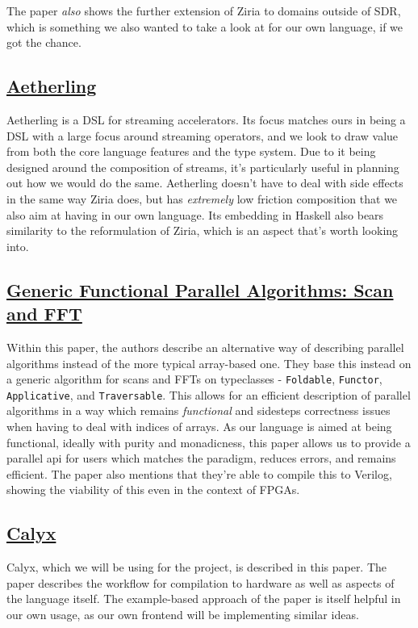 \documentclass{article}
\begin{document}
The paper \textit{also} shows the further extension of Ziria to domains outside of SDR,
which is something we also wanted to take a look at for our own language, if we got the chance.

\subsection{\href{https://aetherling.org/aetherling.pdf}{Aetherling}}
Aetherling is a DSL for streaming accelerators. Its focus matches ours in being a DSL
with a large focus around streaming operators, and we look to draw value from both
the core language features and the type system. Due to it being designed around
the composition of streams, it's particularly useful in planning out how we would do the same.
Aetherling doesn't have to deal with side effects in the same way Ziria does, but has
\textit{extremely} low friction composition that we also aim at having in our own language. Its embedding
in Haskell also bears similarity to the reformulation of Ziria, which is an aspect that's worth looking into.

\subsection{\href{https://dl.acm.org/doi/pdf/10.1145/3110251}{Generic Functional Parallel Algorithms: Scan and FFT}}
Within this paper, the authors describe an alternative way of describing parallel algorithms
instead of the more typical array-based one. They base this instead on a generic algorithm for scans and FFTs
on typeclasses - \texttt{Foldable}, \texttt{Functor}, \texttt{Applicative}, and \texttt{Traversable}. 
This allows for an efficient description of parallel algorithms in a way which remains \textit{functional} and sidesteps correctness issues when having to deal with indices of arrays. As our language is aimed at being functional, ideally with purity and monadicness, this paper allows us to provide a parallel api for users which matches the paradigm, reduces errors, and remains efficient. The paper also mentions that they're able to compile this to Verilog, showing the viability of this even in the context of FPGAs.

\subsection{\href{https://rachit.pl/files/pubs/calyx.pdf}{Calyx}}
Calyx, which we will be using for the project, is described in this paper. The
paper describes the workflow for compilation to hardware as well as aspects of
the language itself. The example-based approach of the paper is itself helpful
in our own usage, as our own frontend will be implementing similar ideas. 
\end{document}
